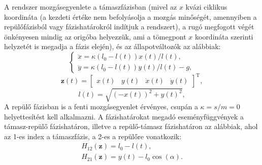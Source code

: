 A rendszer mozgásegyenlete a támaszfázisban (mivel az $x$ kvázi ciklikus koordináta (a kezdeti értéke nem befolyásolja a mozgás minőségét, amennyiben a repülőfázisból vagy fá\-zis\-ha\-tá\-rok\-ról indítjuk a rendszert), a rugó megfogott végét önkényesen mindig az origóba helyezzük, ami a tömegpont $x$ koordináta szerinti helyzetét is megadja a fázis elején), és az állapotváltozók az alábbiak:
\begin{equation}
\begin{cases}
\ddot{x} = \kappa\left(l_0 - l(t) \right)x(t)/l(t),\\
\ddot{y} = \kappa\left(l_0 - l(t) \right)y(t)/l(t) - g,
\end{cases}
\end{equation}
\begin{equation}
\mathbf{z}(t)= \begin{bmatrix}
x(t) & y(t) & \dot{x}(t) & \dot{y}(t)
\end{bmatrix}^\mathrm{T},
\end{equation}
\begin{equation}
l(t) = \sqrt{\left(-x(t)\right)^2 + y(t)^2},
\end{equation}
A repülő fázisban is a fenti mozgásegyenlet érvényes, csupán a $\kappa = s/m = 0$ helyettesítést kell alkalmazni.
A fázishatárokat megadó eseményfüggvények a támasz-repülő fázishatáron, illetve a repülő-támasz fázishatáron az a\-láb\-bi\-ak, ahol az 1-es index a támaszfázis, a 2-es a repülőre vonatkozik:
\begin{equation}
\begin{matrix}
H_{12}(\mathbf{z}) = l_0 - l(t), \\
H_{21}(\mathbf{z}) = y(t) - l_0\cos(\alpha).
\end{matrix}
\end{equation}

